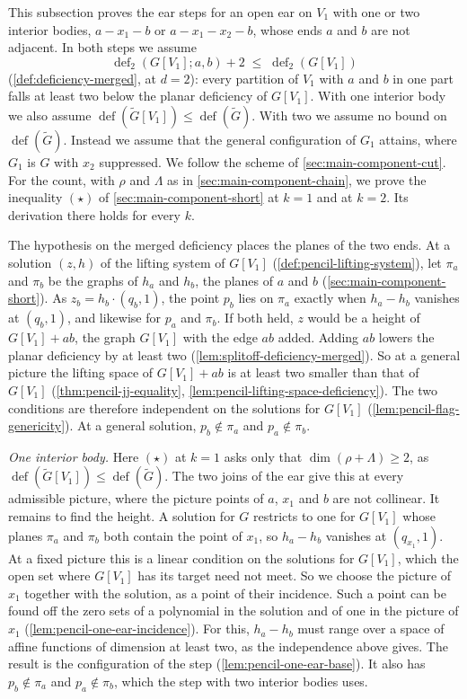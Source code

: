 This subsection proves the ear steps for an open ear on $V_1$ with one or
two interior bodies, $a - x_1 - b$ or $a - x_1 - x_2 - b$, whose ends $a$
and $b$ are not adjacent. In both steps we assume
\[
  \operatorname{def}_2(G[V_1]; a, b) + 2 \;\le\;
  \operatorname{def}_2(G[V_1])
\]
(\cref{def:deficiency-merged}, at $d = 2$): every partition of $V_1$ with
$a$ and $b$ in one part falls at least two below the planar deficiency of
$G[V_1]$. With one interior body we also assume
$\operatorname{def}(\tilde G[V_1]) \le \operatorname{def}(\tilde G)$.
With two we assume no bound on $\operatorname{def}(\tilde G)$. Instead we assume that the
general configuration of $G_1$ attains, where $G_1$ is $G$ with $x_2$ suppressed.
We follow the scheme of \cref{sec:main-component-cut}. For the count, with
$\rho$ and $\Lambda$ as in \cref{sec:main-component-chain}, we prove the
inequality $(\star)$ of \cref{sec:main-component-short} at $k = 1$ and
at $k = 2$. Its derivation there holds for every $k$.

The hypothesis on the merged deficiency places the planes of the two
ends. At a solution $(z, h)$ of the lifting system of $G[V_1]$
(\cref{def:pencil-lifting-system}), let $\pi_a$ and $\pi_b$ be
the graphs of $h_a$ and $h_b$, the planes of $a$ and $b$
(\cref{sec:main-component-short}). As $z_b = h_b \cdot (q_b, 1)$, the
point $p_b$ lies on $\pi_a$ exactly when $h_a - h_b$ vanishes at
$(q_b, 1)$, and likewise for $p_a$ and $\pi_b$. If both held, $z$ would be
a height of $G[V_1] + ab$, the graph $G[V_1]$ with the edge $ab$ added.
Adding $ab$ lowers the planar deficiency by at least two
(\cref{lem:splitoff-deficiency-merged}). So at a general picture the
lifting space of $G[V_1] + ab$ is at least two smaller than that of
$G[V_1]$ (\cref{thm:pencil-jj-equality},
\cref{lem:pencil-lifting-space-deficiency}). The two conditions are
therefore independent on the solutions for $G[V_1]$
(\cref{lem:pencil-flag-genericity}). At a general solution,
$p_b \notin \pi_a$ and $p_a \notin \pi_b$.

\emph{One interior body.} Here $(\star)$ at $k = 1$ asks only that
$\dim(\rho + \Lambda) \ge 2$, as
$\operatorname{def}(\tilde G[V_1]) \le \operatorname{def}(\tilde G)$. The
two joins of the ear give this at every admissible picture, where the
picture points of $a$, $x_1$ and $b$ are not collinear. It remains to
find the height. A solution for $G$ restricts to one for $G[V_1]$ whose
planes $\pi_a$ and $\pi_b$ both contain the point of $x_1$, so $h_a - h_b$
vanishes at $(q_{x_1}, 1)$. At a fixed picture this is a linear condition
on the solutions for $G[V_1]$, which the open set where $G[V_1]$ has its
target need not meet. So we choose the picture of $x_1$ together with the
solution, as a point of their incidence. Such a point can be found off
the zero sets of a polynomial in the solution and of one in the picture
of $x_1$ (\cref{lem:pencil-one-ear-incidence}). For this, $h_a - h_b$ must
range over a space of affine functions of dimension at least two, as the
independence above gives. The result is the configuration of the step
(\cref{lem:pencil-one-ear-base}). It also has $p_b \notin \pi_a$ and
$p_a \notin \pi_b$, which the step with two interior bodies uses.


